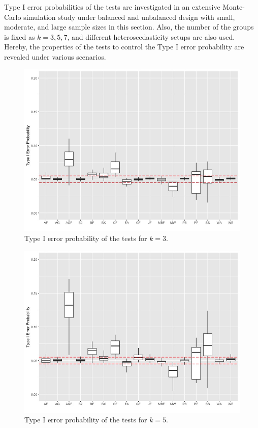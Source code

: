Type I error probabilities of the tests are investigated in an extensive Monte-Carlo simulation study under balanced and unbalanced design with small, moderate, and large sample sizes in this section. Also, the number of the groups is fixed as $k=3, 5, 7$, and different heteroscedasticity setups are also used. Hereby, the properties of the tests to control the Type I error probability are revealed under various scenarios.

\begin{figure}
\centering
\includegraphics[scale=0.5]{error_plot_k3.png}
\caption{Type I error probability of the tests for $k=3$.}
\label{fig:k3}
\end{figure}

\begin{figure}
\centering
\includegraphics[scale=0.5]{error_plot_k5.png}
\caption{Type I error probability of the tests for $k=5$.}
\label{fig:k5}
\end{figure}

